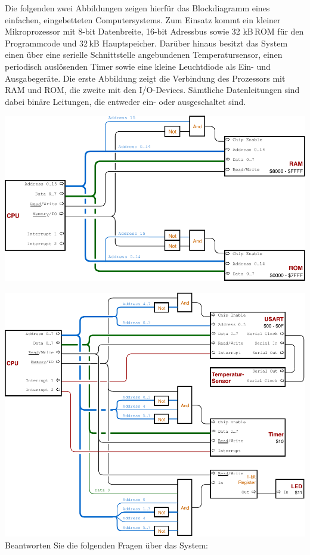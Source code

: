 Die folgenden zwei Abbildungen zeigen hierfür das Blockdiagramm eines einfachen,
eingebetteten Computersystems. Zum Einsatz kommt ein kleiner Mikroprozessor
mit 8-bit Datenbreite, 16-bit Adressbus sowie 32 kB\,ROM für den Programmcode
und 32\,kB Hauptspeicher. Darüber hinaus besitzt das System einen über eine
serielle Schnittstelle angebundenen Temperatursensor, einen periodisch
auslösenden Timer sowie eine kleine Leuchtdiode als Ein- und Ausgabegeräte.
Die erste Abbildung zeigt die Verbindung des Prozessors mit RAM und ROM, die
zweite mit den I/O-Devices. Sämtliche Datenleitungen sind dabei binäre Leitungen,
die entweder ein- oder ausgeschaltet sind.

\bigskip
\includegraphics[width=\textwidth]{1-grundlagen/img/aufgabe-rechnerarchitektur-1}

\includegraphics[width=\textwidth]{1-grundlagen/img/aufgabe-rechnerarchitektur-2}
\bigskip
Beantworten Sie die folgenden Fragen über das System:


